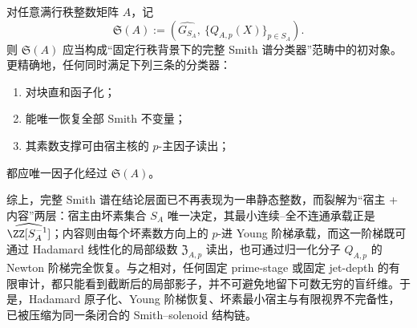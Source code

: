 \begin{conjecture}\label{conj:conclusion-smith-solenoid-initial-object}
对任意满行秩整数矩阵 \(A\)，记
\[
\mathfrak S(A):=
\left(
\widehat{G_{S_A}},
\ \{Q_{A,p}(X)\}_{p\in S_A}
\right).
\]
则 \(\mathfrak S(A)\) 应当构成“固定行秩背景下的完整 Smith 谱分类器”范畴中的初对象。更精确地，任何同时满足下列三条的分类器：
\begin{enumerate}
  \item 对块直和函子化；
  \item 能唯一恢复全部 Smith 不变量；
  \item 其素数支撑可由宿主核的 \(p\)-主因子读出；
\end{enumerate}
都应唯一因子化经过 \(\mathfrak S(A)\)。
\end{conjecture}

\noindent
综上，完整 Smith 谱在结论层面已不再表现为一串静态整数，而裂解为“宿主 + 内容”两层：宿主由坏素集合 \(S_A\) 唯一决定，其最小连续--全不连通承载正是 \(\widehat{\ZZ[S_A^{-1}]}\)；内容则由每个坏素数方向上的 \(p\)-进 Young 阶梯承载，而这一阶梯既可通过 Hadamard 线性化的局部级数 \(\mathfrak Z_{A,p}\) 读出，也可通过归一化分子 \(Q_{A,p}\) 的 Newton 阶梯完全恢复。与之相对，任何固定 prime-stage 或固定 jet-depth 的有限审计，都只能看到截断后的局部影子，并不可避免地留下可数无穷的盲纤维。于是，Hadamard 原子化、Young 阶梯恢复、坏素最小宿主与有限视界不完备性，已被压缩为同一条闭合的 Smith--solenoid 结构链。

\endinput
